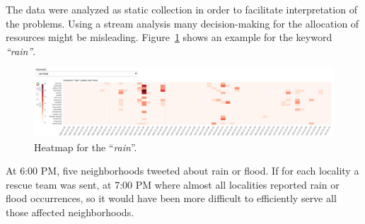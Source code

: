 The data were analyzed as static collection in order to facilitate
interpretation of the problems. Using a stream analysis many decision-making
for the allocation of resources might be misleading.
Figure~\ref{fig:rain_4_heat} shows an example for the keyword \emph{``rain''}.

\begin{figure}[!h]
    \centering
    \includegraphics[width=1.00\textwidth]{figs/q4/rain_4_heat}
    \caption{Heatmap for the ``\emph{rain}''.}
    \label{fig:rain_4_heat}
\end{figure}

At 6:00 PM, five neighborhoods tweeted about rain or flood. If for each locality
a rescue team was sent, at 7:00 PM where almost all localities reported rain or
flood occurrences, so it would have been more difficult to efficiently serve all
those affected neighborhoods.
